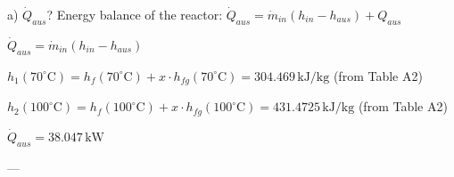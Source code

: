 a) \( \dot{Q}_{aus} \)?  
Energy balance of the reactor:  
\( \dot{Q}_{aus} = \dot{m}_{in} (h_{in} - h_{aus}) + Q_{aus} \)  

\( \dot{Q}_{aus} = \dot{m}_{in} (h_{in} - h_{aus}) \)  

\( h_1 (70^\circ \text{C}) = h_f (70^\circ \text{C}) + x \cdot h_{fg} (70^\circ \text{C}) = 304.469 \, \text{kJ/kg} \) (from Table A2)  

\( h_2 (100^\circ \text{C}) = h_f (100^\circ \text{C}) + x \cdot h_{fg} (100^\circ \text{C}) = 431.4725 \, \text{kJ/kg} \) (from Table A2)  

\( \dot{Q}_{aus} = 38.047 \, \text{kW} \)  

---